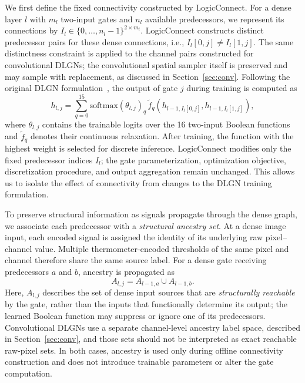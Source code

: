 We first define the fixed connectivity constructed by LogicConnect. For a
dense layer $l$ with $m_l$ two-input gates and $n_l$ available predecessors,
we represent its connections by
$I_l\in\{0,\ldots,n_l-1\}^{2\times m_l}$. LogicConnect constructs distinct
predecessor pairs for these dense connections, i.e.,
$I_l[0,j]\neq I_l[1,j]$. The same distinctness constraint is applied to the
channel pairs constructed for convolutional DLGNs; the convolutional spatial
sampler itself is preserved and may sample with replacement, as discussed in
Section~\ref{sec:conv}. Following the original DLGN
formulation~\cite{petersen2022}, the output of
gate $j$ during training is computed as
%
\begin{equation}
h_{l,j} =
\sum_{q=0}^{15}
\mathrm{softmax}(\theta_{l,j})_q\,
\widetilde{f}_q
\!\left(
h_{l-1,I_l[0,j]},
h_{l-1,I_l[1,j]}
\right),
\label{eq:gate}
\end{equation}
%
where $\theta_{l,j}$ contains the trainable logits over the 16 two-input
Boolean functions and $\widetilde{f}_q$ denotes their continuous
relaxation. After training, the function with the highest weight is selected
for discrete inference. LogicConnect modifies only the fixed predecessor
indices $I_l$; the gate parameterization, optimization objective,
discretization procedure, and output aggregation remain unchanged. This
allows us to isolate the effect of connectivity from changes to the DLGN
training formulation.

To preserve structural information as signals propagate through the dense
graph, we associate each predecessor with a \emph{structural ancestry set}.
At a dense image input, each encoded signal is assigned the identity of its
underlying raw pixel--channel value. Multiple thermometer-encoded thresholds
of the same pixel and channel therefore share the same source label. For a
dense gate receiving predecessors $a$ and $b$, ancestry is propagated as
%
\begin{equation}
A_{l,j}=A_{l-1,a}\cup A_{l-1,b}.
\label{eq:ancestry}
\end{equation}
%
Here, $A_{l,j}$ describes the set of dense input sources that are
\emph{structurally reachable} by the gate, rather than the inputs that
functionally determine its output; the learned Boolean function may suppress
or ignore one of its predecessors. Convolutional DLGNs use a separate
channel-level ancestry label space, described in
Section~\ref{sec:conv}, and those sets should not be interpreted as exact
reachable raw-pixel sets. In both cases, ancestry is used only during offline
connectivity construction and does not introduce trainable parameters or
alter the gate computation.

